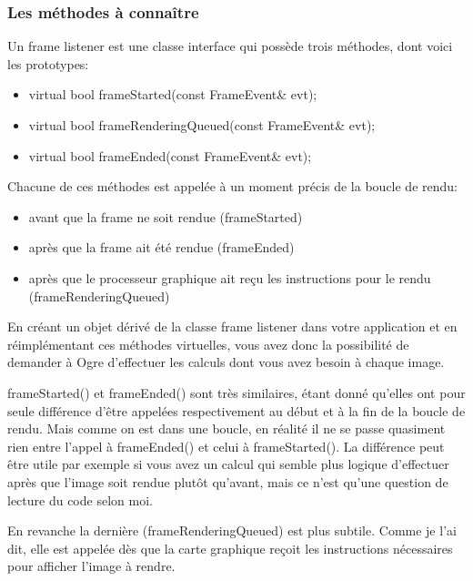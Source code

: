 \documentclass[10pt,a4paper]{report}
\begin{document}
\subsubsection{Les m\'ethodes \`{a} conna\^itre}
Un frame listener est une classe interface qui poss\`ede trois m\'ethodes, dont voici les prototypes:

\begin{itemize}
\item virtual bool frameStarted(const FrameEvent\& evt);
\item virtual bool frameRenderingQueued(const FrameEvent\& evt);
\item virtual bool frameEnded(const FrameEvent\& evt);
\end{itemize}
    

Chacune de ces m\'ethodes est appel\'ee \`{a} un moment pr\'ecis de la boucle de rendu:
\begin{itemize}
\item avant que la frame ne soit rendue (frameStarted)
\item apr\`es que la frame ait \'et\'e rendue (frameEnded)
\item apr\`es que le processeur graphique ait re\c{c}u les instructions pour le rendu (frameRenderingQueued)
\end{itemize}





En cr\'eant un objet d\'eriv\'e de la classe frame listener dans votre application et en r\'eimpl\'ementant ces m\'ethodes virtuelles, vous avez donc la possibilit\'e de demander \`{a} Ogre d'effectuer les calculs dont vous avez besoin \`{a} chaque image.



frameStarted() et frameEnded() sont tr\`es similaires, \'etant donn\'e qu'elles ont pour seule diff\'erence d'\^etre appel\'ees respectivement au d\'ebut et \`{a} la fin de la boucle de rendu. Mais comme on est dans une boucle, en r\'ealit\'e il ne se passe quasiment rien entre l'appel \`{a} frameEnded() et celui \`{a} frameStarted(). La diff\'erence peut \^etre utile par exemple si vous avez un calcul qui semble plus logique d'effectuer apr\`es que l'image soit rendue plut\^ot qu'avant, mais ce n'est qu'une question de lecture du code selon moi.


En revanche la derni\`ere (frameRenderingQueued) est plus subtile. Comme je l'ai dit, elle est appel\'ee d\`es que la carte graphique re\c{c}oit les instructions n\'ecessaires pour afficher l'image \`{a} rendre.
\end{document}
